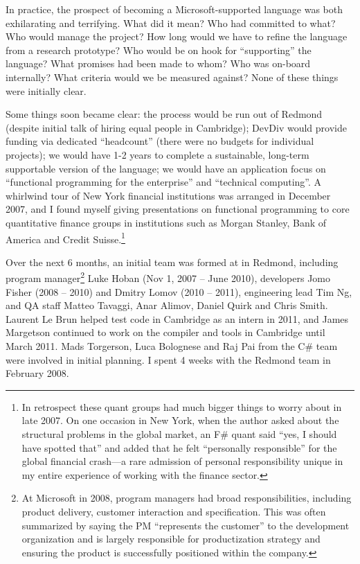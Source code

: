 \documentclass[acmsmall]{acmart}\settopmatter{}
\begin{document}
In practice, the prospect of becoming a Microsoft-supported language was both exhilarating and terrifying. What did
it mean? Who had committed to what?  Who would manage the project? How long would we have to refine the
language from a research prototype?  Who would be on hook for “supporting” the language? What promises
had been made to whom? Who was on-board internally? What criteria would we be measured against?  None of these things were initially clear.  

Some things soon became clear: the process would be run out of Redmond (despite initial talk of hiring equal people in
Cambridge); DevDiv would provide funding via dedicated “headcount” (there were no budgets for individual projects); we
would have 1-2 years to complete a sustainable, long-term supportable version of the language; we would have an
application focus on “functional programming for the enterprise” and “technical computing”. A whirlwind tour of New York
financial institutions was arranged in December 2007, and I found myself giving presentations on functional programming
to core quantitative finance groups in institutions such as Morgan Stanley, Bank of America and
Credit Suisse.\footnote{ In retrospect these quant groups had much bigger things to worry about in
late 2007. On one occasion in New York, when the author asked about the structural problems in the
global market, an F\# quant said “yes, I should have spotted that” and added that he felt “personally
responsible” for the global financial crash---a rare admission of personal responsibility unique in my entire
experience of working with the finance sector.}

Over the next 6 months, an initial team was formed at in Redmond, including program
manager\footnote{At Microsoft in 2008, program managers had broad responsibilities, including product delivery,
customer interaction and specification. This was often summarized by saying the PM “represents the customer” to
the development organization and is largely responsible for productization strategy and ensuring the product is
successfully positioned within the company.} Luke Hoban  (Nov 1, 2007 -- June 2010), developers
Jomo Fisher (2008 -- 2010) and Dmitry Lomov (2010 -- 2011), engineering lead Tim Ng, and QA staff Matteo Tavaggi, Anar Alimov, Daniel Quirk and
Chris Smith.  Laurent Le Brun helped test code in Cambridge as an intern in 2011, and James Margetson
continued to work on the compiler and tools in Cambridge until March 2011.  Mads Torgerson, Luca Bolognese
and Raj Pai from the C\# team were involved in initial planning. I spent 4 weeks with the Redmond team in February 2008.
\end{document}
